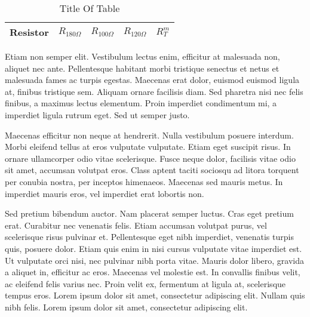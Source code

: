 \documentclass[11pt,oneside,openright]{book}
\begin{document}
\begin{table}
\centering
\caption{Title Of Table}
\begin{tabular}{|p{3cm}|p{1.5cm}|p{1.5cm}|p{1.5cm}|p{1.5cm}|}
\hline
Resistor & $R_{180\Omega}$ & $R_{100\Omega}$ & $R_{120\Omega}$ & $R_T^m$\\
\hline
\end{tabular}
\end{table}

Etiam non semper elit. Vestibulum lectus enim, efficitur at malesuada non, aliquet nec ante. Pellentesque habitant morbi tristique senectus et netus et malesuada fames ac turpis egestas. Maecenas erat dolor, euismod euismod ligula at, finibus tristique sem. Aliquam ornare facilisis diam. Sed pharetra nisi nec felis finibus, a maximus lectus elementum. Proin imperdiet condimentum mi, a imperdiet ligula rutrum eget. Sed ut semper justo.

Maecenas efficitur non neque at hendrerit. Nulla vestibulum posuere interdum. Morbi eleifend tellus at eros vulputate vulputate. Etiam eget suscipit risus. In ornare ullamcorper odio vitae scelerisque. Fusce neque dolor, facilisis vitae odio sit amet, accumsan volutpat eros. Class aptent taciti sociosqu ad litora torquent per conubia nostra, per inceptos himenaeos. Maecenas sed mauris metus. In imperdiet mauris eros, vel imperdiet erat lobortis non.

Sed pretium bibendum auctor. Nam placerat semper luctus. Cras eget pretium erat. Curabitur nec venenatis felis. Etiam accumsan volutpat purus, vel scelerisque risus pulvinar et. Pellentesque eget nibh imperdiet, venenatis turpis quis, posuere dolor. Etiam quis enim in nisi cursus vulputate vitae imperdiet est. Ut vulputate orci nisi, nec pulvinar nibh porta vitae. Mauris dolor libero, gravida a aliquet in, efficitur ac eros. Maecenas vel molestie est. In convallis finibus velit, ac eleifend felis varius nec. Proin velit ex, fermentum at ligula at, scelerisque tempus eros. Lorem ipsum dolor sit amet, consectetur adipiscing elit. Nullam quis nibh felis. Lorem ipsum dolor sit amet, consectetur adipiscing elit.
\end{document}
